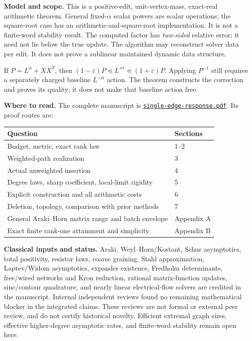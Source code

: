 \documentclass[11pt]{article}
\begin{document}
\textbf{Model and scope.}
This is a positive-edit, unit-vertex-mass, exact-real arithmetic theorem.
General fixed-$\alpha$ scalar powers are scalar operations; the
square-root case has an arithmetic-and-square-root implementation.
It is not a finite-word stability result. The computed factor has
\emph{two-sided} relative error; it need not lie below the true update.
The algorithm may reconstruct solver data per edit. It does not prove a
sublinear maintained dynamic data structure.

If $P=L^\alpha+XX^T$, then
$(1-\varepsilon)P\preceq L'^\alpha\preceq(1+\varepsilon)P$.
Applying $P^{-1}$ still requires a separately charged baseline
$L^{-\alpha}$ action. The theorem constructs the correction and proves
its quality; it does not make that baseline action free.

\textbf{Where to read.}
The complete manuscript is
\href{single-edge-response.pdf}{\texttt{single-edge-response.pdf}}.
Its proof routes are:

\begin{tabular}{@{}p{}p{}@{}}
Question & Sections\\ \hline
Budget, metric, exact rank law & 1--2\\
Weighted-path realization & 3\\
Actual unweighted insertion & 4\\
Degree laws, sharp coefficient, local-limit rigidity & 5\\
Explicit construction and all arithmetic costs & 6\\
Deletion, topology, comparison with prior methods & 7\\
General Araki--Horn matrix range and batch envelope & Appendix A\\
Exact finite rank-one attainment and simplicity & Appendix B
\end{tabular}

\textbf{Classical inputs and status.}
Araki, Weyl--Horn/Kostant, Schur asymptotics, total positivity, resistor
laws, coarse graining, Stahl approximation, Laptev/Widom asymptotics,
expander existence, Fredholm determinants, free/wired networks and Kron
reduction, rational matrix-function updates, sinc/contour
quadrature, and nearly linear electrical-flow solvers are credited in
the manuscript. Internal independent reviews found no remaining
mathematical blocker in the integrated claims. These reviews are not
formal or external peer review, and do not certify historical novelty.
Efficient extremal graph sizes, effective higher-degree asymptotic
rates, and finite-word stability remain open here.
\end{document}
